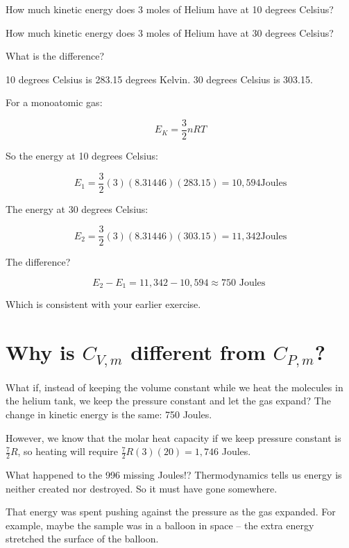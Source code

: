 \begin{Exercise}[title={Warming Helium Revisited},  label=warming_helium2]

How much kinetic energy does 3 moles of Helium have at 10 degrees Celsius?

How much kinetic energy does 3 moles of Helium have at 30 degrees Celsius?

What is the difference?

\end{Exercise}
\begin{Answer}[ref=warming_helium2]

10 degrees Celsius is 283.15 degrees Kelvin.  30 degrees Celsius is 303.15.

For a monoatomic gas:

$$E_K = \frac{3}{2} n R T$$

So the energy at 10 degrees Celsius:

$$E_1 = \frac{3}{2} (3) (8.31446)(283.15) = 10,594 \text{Joules}$$

The energy at 30 degrees Celsius:

$$E_2 = \frac{3}{2} (3) (8.31446)(303.15) = 11,342 \text{Joules}$$

The difference?

$$E_2 - E_1 = 11,342 - 10,594 \approx 750 \text{ Joules }$$

Which is consistent with your earlier exercise.

\end{Answer}

\section{Why is $C_{V,m}$ different from $C_{P,m}$?}

What if, instead of keeping the volume constant while we heat the molecules in the helium tank,  we keep the pressure constant and let the gas expand?  
The change in kinetic energy is the same: 750 Joules.

However,  we know that the molar heat capacity if we keep pressure constant is $\frac{7}{2}R$,  so  heating will require $\frac{7}{2}R(3)(20) = 1,746$ Joules.  

What happened to the 996 missing Joules!?  Thermodynamics tells us energy is neither created nor destroyed.  So it must have gone somewhere.

That energy was spent pushing against the pressure as the gas expanded.  For example,  maybe the sample was in a balloon in space -- the extra energy stretched the surface of the balloon.  

